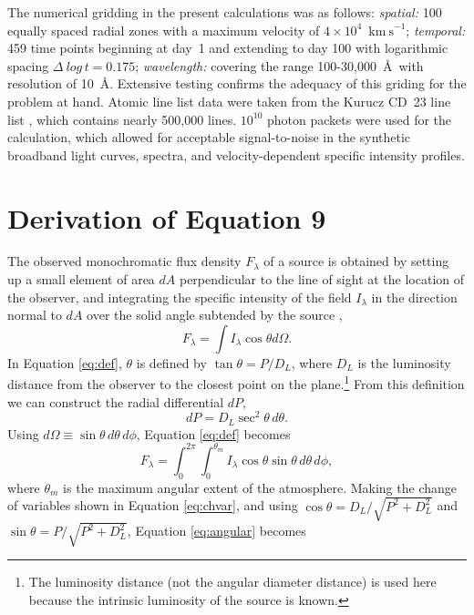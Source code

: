 \documentclass[iop,apj,numberedappendix,twocolappendix]{emulateapj}
\newcommand{\kms}{\ensuremath{\mathrm{km~s}^{-1}}}
\begin{document}
The numerical gridding in the present calculations was as follows:
\emph{spatial:} 100 equally spaced radial zones with a maximum velocity of $4 \times 10^4$~\kms;
\emph{temporal:} 459 time points beginning at day~1 and extending to day 100 with logarithmic spacing $\Delta \ log\,t = 0.175$;
\emph{wavelength:} covering the range 100-30,000~\AA\ with resolution of 10~\AA.
Extensive testing confirms the adequacy of this griding for the problem at hand.
Atomic line list data were taken from the Kurucz CD~23 line list \citep{Kurucz_Lines}, which contains nearly 500,000 lines.
$10^{10}$ photon packets were used for the calculation, which allowed for acceptable signal-to-noise in the synthetic broadband light curves, spectra, and velocity-dependent specific intensity profiles.

\section{Derivation of Equation 9}
\label{sec:geom}
The observed monochromatic flux density $F_\lambda$ of a source is obtained by setting up a small element of area $dA$ perpendicular to the line of sight at the location of the observer, and integrating the specific intensity of the field $I_\lambda$ in the direction normal to $dA$ over the solid angle subtended by the source \citep{rl},
\begin{equation}
\label{eq:def}
F_\lambda = \int I_\lambda \cos \theta d\Omega.
\end{equation}
In Equation \ref{eq:def}, $\theta$ is defined by $\tan \theta = P / D_L$, where $D_L$ is the luminosity distance from the observer to the closest point on the plane.\footnote{
The luminosity distance (not the angular diameter distance) is used here because the intrinsic luminosity of the source is known.}
From this definition we can construct the radial differential $dP$,
\begin{equation}
\label{eq:chvar}
dP = D_L \sec^2\theta\, d\theta.
\end{equation}
Using $d\Omega \equiv \sin\theta\,d\theta\,d\phi$, Equation \ref{eq:def} becomes
\begin{equation}
\label{eq:angular}
F_\lambda = \int^{2\pi}_0 \int^{\theta_m}_0 I_\lambda  \cos\theta \sin\theta \,d\theta\,d\phi,
\end{equation}
where $\theta_m$ is the maximum angular extent of the atmosphere.
Making the change of variables shown in Equation \ref{eq:chvar}, and using $\cos \theta = D_L / \sqrt{P^2 + D_L^2}$ and $\sin \theta = P / \sqrt{P^2 + D_L^2}$,  Equation \ref{eq:angular} becomes
\end{document}

